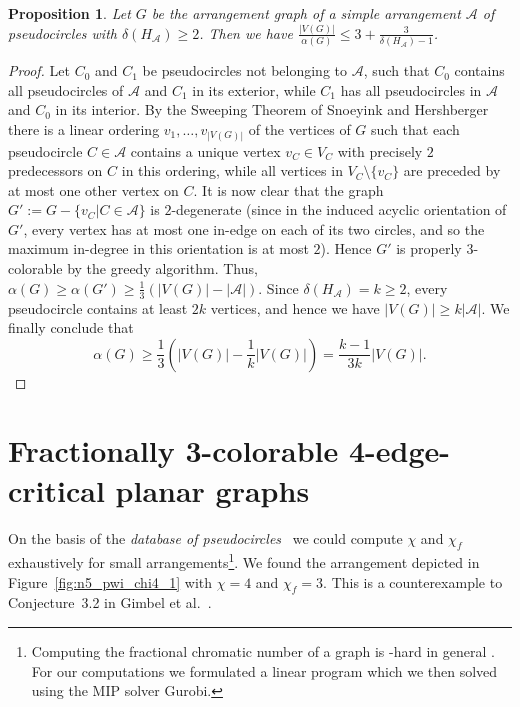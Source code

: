 \documentclass[fontsize=11pt,a4paper,DIV12]{scrartcl}
\newtheorem{proposition}[theorem]{Proposition}
\begin{document}
\begin{proposition}
  Let $G$ be the arrangement graph of a simple arrangement $\mathcal{A}$ of
  pseudocircles with $\delta(H_{\mathcal{A}}) \ge 2$. Then we
  have $\frac{|V(G)|}{\alpha(G)} \le 3+\frac{3}{\delta(H_{\mathcal{A}})-1}$.
\end{proposition}
\begin{proof}
  Let $C_0$ and $C_1$ be pseudocircles not belonging to $\mathcal{A}$, such
  that $C_0$ contains all pseudocircles of $\mathcal{A}$ and $C_1$ in its
  exterior, while $C_1$ has all pseudocircles in $\mathcal{A}$ and $C_0$ in
  its interior. By the Sweeping Theorem of Snoeyink and Hershberger
  \cite[Theorem~3.1]{SnoeyinkHershberger1991} there is a linear ordering
  $v_1,\ldots,v_{|V(G)|}$ of the vertices of $G$ such that each
  pseudocircle $C \in \mathcal{A}$ contains a unique vertex $v_C \in V_C$ with
  precisely $2$ predecessors on $C$ in this ordering, while all vertices in
  $V_C\setminus \{v_C\}$ are preceded by at most one other vertex on $C$.  It
  is now clear that the graph $G':=G-\{v_C|C \in \mathcal{A}\}$ is
  $2$-degenerate (since in the induced acyclic orientation of $G'$, every
  vertex has at most one in-edge on each of its two circles, and so the maximum
  in-degree in this orientation is at most $2$). Hence $G'$ is properly
  $3$-colorable by the greedy algorithm. Thus,
  $\alpha(G) \ge \alpha(G') \ge \frac{1}{3}(|V(G)|-|\mathcal{A}|)$. Since
  $\delta(H_{\mathcal{A}}) = k \ge 2$, every pseudocircle contains at least $2k$
  vertices, and hence we have $|V(G)| \ge k |\mathcal{A}|$. We finally
  conclude that
  $$
  \alpha(G) \ge
  \frac{1}{3}\left(|V(G)|-\frac{1}{k}|V(G)|\right)=\frac{k-1}{3k}|V(G)|.
  $$
\end{proof}

\section{Fractionally 3-color\-able 4-edge-critical planar graphs}
\label{sec:gimbel}

On the basis of the \emph{database of pseudocircles}~\cite{pseudocircles_website}
we could compute $\chi$ and $\chi_f$ exhaustively for small arrangements\footnote{
  Computing the fractional chromatic number of a graph is \NP-hard in general
  \cite{LundYannakakis1994}.  For our computations we formulated a linear
  program which we then solved using the MIP solver Gurobi.}.
We found the arrangement depicted in
Figure~\ref{fig:n5_pwi_chi4_1} with $\chi=4$ and $\chi_f=3$. This is a
counterexample to Conjecture~3.2 in Gimbel et al.~\cite{GimbelKLT2019}.
\end{document}
